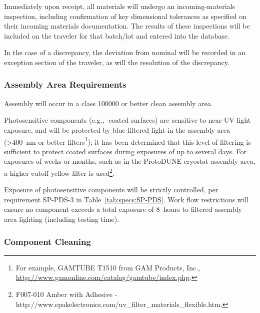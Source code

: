 Immediately upon receipt, all materials will undergo an incoming-materials inspection, including confirmation of key dimensional tolerances as specified on their incoming materials documentation. %
The results of these inspections will be included on the traveler for that batch/lot and entered into the database.

In the case of a discrepancy, the deviation from nominal will be recorded in an exception section of the traveler, as will the resolution of the discrepancy.

\subsubsection{Assembly Area Requirements}

Assembly will occur in a class \num{100000} or better clean assembly area.  

%

Photosensitive components (e.g., -coated surfaces) are sensitive to near-UV light exposure, and will be protected by blue-filtered light in the assembly area (>\SI{400}{nm} or better filters\footnote{For example, GAMTUBE T1510\texttrademark{} from GAM Products, Inc., \url{http://www.gamonline.com/catalog/gamtube/index.php}.}); it has been determined that this level of filtering is sufficient to protect coated surfaces during  exposures of up to several days. For exposures of weeks or months, such as in the ProtoDUNE cryostat assembly area, a higher cutoff yellow filter is used\footnote{F007-010\texttrademark{} Amber with Adhesive - http://www.epakelectronics.com/uv\_filter\_materials\_flexible.htm.}. 


Exposure of photosensitive components will be strictly controlled, per requirement SP-PDS-3 in Table~\ref{tab:specs:SP-PDS}.  
Work flow restrictions will %
ensure no component exceeds a total exposure of \SI{8}{hours} to filtered assembly area lighting (including testing time).

\subsubsection{Component Cleaning}

